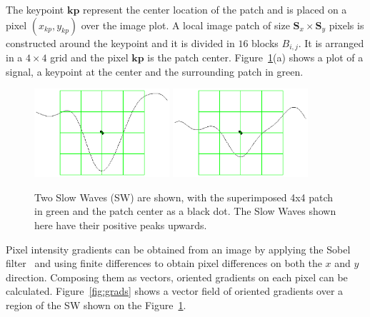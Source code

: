 \documentclass[review]{elsarticle}
\begin{document}
The keypoint $\mathbf{kp}$ represent the center location of the patch and is placed on a pixel $(x_{kp}, y_{kp})$ over the image plot. A local image patch of size $\mathbf{S}_x \times \mathbf{S}_y$ pixels is constructed around the keypoint and it is divided in $16$ blocks $B_{i,j}$. It is arranged in a $4 \times 4$ grid and the pixel $\mathbf{kp}$ is the patch center.  Figure~\ref{fig:sampledescriptor}(a) shows a plot of a signal, a keypoint at the center and the surrounding patch in green.

\begin{figure}[h!]
\centering
\includegraphics[width=5cm]{images/sws.eps}
\includegraphics[width=5cm]{images/sws2.eps}
\caption[Descriptor]{Two Slow Waves (SW) are shown, with the superimposed 4x4 patch in green and the patch center as a black dot.  The Slow Waves shown here have their positive peaks upwards.}
\label{fig:sampledescriptor}
\end{figure}

Pixel intensity gradients can be obtained from an image by applying the Sobel filter~\cite{Szeliski2010} and using finite differences to obtain pixel differences on both the $x$ and $y$ direction.  Composing them as vectors, oriented gradients on each pixel can be calculated.  Figure~\ref{fig:grads} shows a vector field of oriented gradients over a region of the SW shown on the Figure~\ref{fig:sampledescriptor}.
\end{document}
